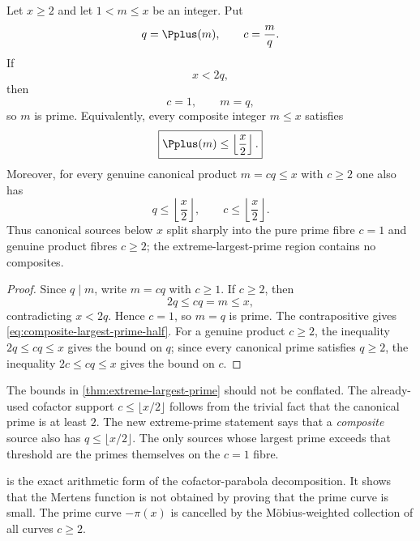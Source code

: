 \begin{theorem}
\label{thm:extreme-largest-prime}
Let $x\ge2$ and let $1<m\le x$ be an integer.  Put
\[
 q=\Pplus(m),\qquad c=\frac{m}{q}.
\]
If
\begin{equation}
 x<2q,
 \label{eq:extreme-q-condition}
\end{equation}
then
\begin{equation}
 \boxed{c=1,\qquad m=q,}
 \label{eq:extreme-prime-fibre}
\end{equation}
so $m$ is prime.  Equivalently, every composite integer $m\le x$ satisfies
\begin{equation}
 \boxed{\Pplus(m)\le\left\lfloor\frac{x}{2}\right\rfloor.}
 \label{eq:composite-largest-prime-half}
\end{equation}
Moreover, for every genuine canonical product $m=cq\le x$ with $c\ge2$ one also has
\begin{equation}
 \boxed{q\le\left\lfloor\frac{x}{2}\right\rfloor,\qquad
 c\le\left\lfloor\frac{x}{2}\right\rfloor.}
 \label{eq:both-canonical-factors-half}
\end{equation}
Thus canonical sources below $x$ split sharply into the pure prime fibre $c=1$ and genuine product fibres $c\ge2$; the extreme-largest-prime region contains no composites.
\end{theorem}

\begin{proof}
Since $q\mid m$, write $m=cq$ with $c\ge1$.  If $c\ge2$, then
\[
 2q\le cq=m\le x,
\]
contradicting $x<2q$.  Hence $c=1$, so $m=q$ is prime.  The contrapositive gives \cref{eq:composite-largest-prime-half}.  For a genuine product $c\ge2$, the inequality $2q\le cq\le x$ gives the bound on $q$; since every canonical prime satisfies $q\ge2$, the inequality $2c\le cq\le x$ gives the bound on $c$.
\end{proof}

\begin{remark}
The bounds in \cref{thm:extreme-largest-prime} should not be conflated.  The already-used cofactor support $c\le\lfloor x/2\rfloor$ follows from the trivial fact that the canonical prime is at least $2$.  The new extreme-prime statement says that a \emph{composite} source also has $q\le\lfloor x/2\rfloor$.  The only sources whose largest prime exceeds that threshold are the primes themselves on the $c=1$ fibre.
\end{remark}

\begin{remark}
 is the exact arithmetic form of the
cofactor-parabola decomposition.  It shows that the Mertens function is
not obtained by proving that the prime curve is small.  The prime curve
$-\pi(x)$ is cancelled by the M\"obius-weighted collection of all
curves $c\ge2$.
\end{remark}

